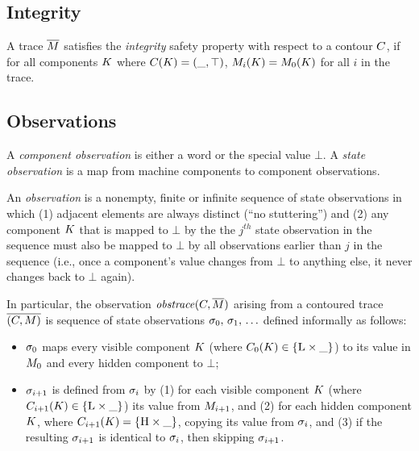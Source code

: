 \documentclass[conference]{IEEEtran}
\begin{document}
\subsection{Integrity}

A trace $\overline{M}$ satisfies the {\em integrity} safety property
with respect to a contour $C$, if for all components
$K$ where $C(K) = (\_, \top)$,
$M_i(K) = M_0(K)$ for all $i$ in the trace.


\subsection{Observations}

A {\em component observation} is either a word or the special value
$\bot$.    A {\em state
  observation} is a map from machine components to component
observations.

An {\em observation} is a nonempty, finite or infinite sequence of state
observations in which (1) adjacent elements are always distinct (``no
stuttering'') and (2) any component $K$ that is mapped to $\bot$ by
the the $j^{th}$ state observation in the sequence must also be mapped to
$\bot$ by all observations earlier than $j$ in the sequence (i.e., once a
component's value changes from $\bot$ to anything else, it never changes
back to $\bot$ again).

In particular, the observation $\mathit{obstrace}(C, \overline{M})$
arising from a contoured trace $\overline{(C, M)}$
is sequence of state observations $\sigma_0,\, \sigma_1,\,
\ldots$ defined informally as follows:
\begin{itemize}
\item $\sigma_0$ maps every visible component $K$ (where
  $C_0(K) \in \{\textsc{L} \times \_\}$) to its value in
  $M_0$ and every hidden component to $\bot$;
\item $\sigma_{i+1}$ is defined from $\sigma_{i}$ by (1) for
  each visible component $K$ (where
  $C_{i+1}(K) \in \{\textsc{L} \times \_ \}$) its value
  from $M_{i+1}$, and (2) for each hidden component $K$,
  where $C_{i+1} (K) = \{\textsc{H} \times \_\}$,
  copying its value from $\sigma_{i}$, and (3) if the resulting
  $\sigma_{i+1}$ is identical to $\sigma_{i}$, then skipping
  $\sigma_{i+1}$.  \iftext{}\fi
\end{itemize}
\iftext{}\fi
\end{document}

